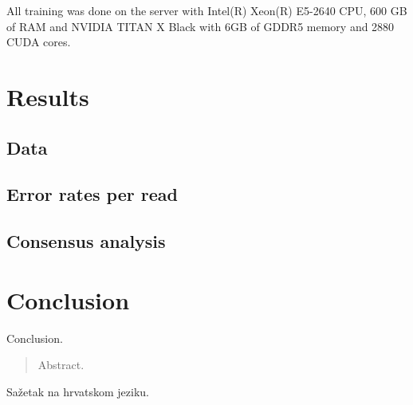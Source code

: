\documentclass[times, utf8, diplomski, english]{fer}
\begin{document}
All training was done on the server with  Intel(R) Xeon(R) E5-2640 CPU, 600 GB of RAM and NVIDIA TITAN X Black with 6GB of GDDR5 memory and 2880 CUDA cores.
\chapter{Results}
\section{Data}
\section{Error rates per read}
\section{Consensus analysis}

\chapter{Conclusion}
Conclusion.






\begin{abstract}
Abstract.

\end{abstract}

\begin{sazetak}
Sažetak na hrvatskom jeziku.

\end{sazetak}
\end{document}
